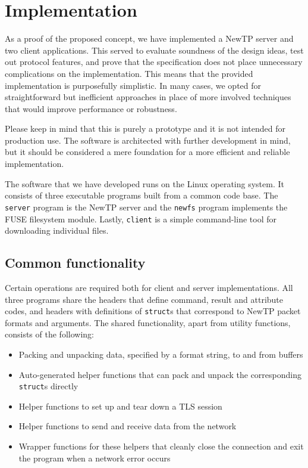 
\chapter{Implementation}

As a proof of the proposed concept, we have implemented a NewTP server and two client applications. This
served to evaluate soundness of the design ideas, test out protocol features, and prove that the specification
does not place unnecessary complications on the implementation. This means that the provided implementation is
purposefully simplistic. In many cases, we opted for straightforward but inefficient approaches in place of
more involved techniques that would improve performance or robustness.

Please keep in mind that this is purely a prototype and it is not intended for production use. The software is
architected with further development in mind, but it should be considered a mere foundation for a more
efficient and reliable implementation.

The software that we have developed runs on the Linux operating system. It consists of three executable
programs built from a common code base. The {\tt server} program is the NewTP server and the {\tt newfs}
program implements the FUSE filesystem module. Lastly, {\tt client} is a simple command-line tool for
downloading individual files.

\section{Common functionality}

Certain operations are required both for client and server implementations. All three programs share the
headers that define command, result and attribute codes, and headers with definitions of {\tt struct}s that
correspond to NewTP packet formats and arguments. The shared functionality, apart from utility functions,
consists of the following:
\begin{itemize}[nolistsep]
	\item Packing and unpacking data, specified by a format string, to and from buffers
	\item Auto-generated helper functions that can pack and unpack the corresponding {\tt struct}s
		directly
	\item Helper functions to set up and tear down a TLS session
	\item Helper functions to send and receive data from the network
	\item Wrapper functions for these helpers that cleanly close the connection and exit the program
		when a network error occurs
\end{itemize}

